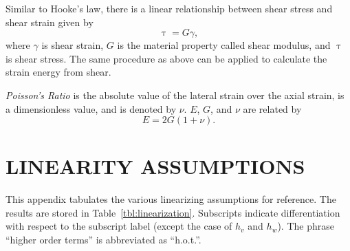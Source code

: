 Similar to Hooke's law, there is a linear relationship between shear stress and shear strain given by
\begin{equation}
\uptau = G\gamma,
\end{equation}
where $\gamma$ is shear strain, $G$ is the material property called shear modulus, and $\uptau$ is shear stress. The same procedure as above can be applied to calculate the strain energy from shear.

\emph{Poisson's Ratio} is the absolute value of the lateral strain over the axial strain, is a dimensionless value, and is denoted by $\nu$. $E$, $G$, and $\nu$ are related by
\begin{equation}
E = 2G(1+\nu).
\end{equation}

\chapter{LINEARITY ASSUMPTIONS}
\label{app:assump}
This appendix tabulates the various linearizing assumptions for reference. The results are stored in Table~\ref{tbl:linearization}. Subscripts indicate differentiation with respect to the subscript label (except the case of $h_v$ and $h_w$). The phrase ``higher order terms'' is abbreviated as ``h.o.t.''.
